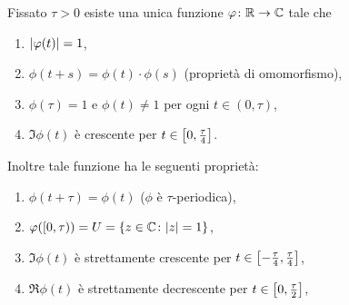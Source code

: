 \begin{theorem}
Fissato $\tau>0$ esiste una unica funzione $\varphi\colon {\mathbb R} \to {\mathbb C}$ tale che 
\begin{enumerate}
\item ${\left|\varphi(t)\right|}=1$,
\item $\phi(t+s)=\phi(t)\cdot \phi(s)$ (proprietà di omomorfismo),
\item $\phi(\tau) = 1$ e $\phi(t)\neq 1$ per ogni $t\in(0,\tau)$,
\item $\Im\phi(t)$ è crescente per $t\in{\left[ 0,\frac \tau 4 \right]}$.
\end{enumerate}

Inoltre tale funzione ha le seguenti proprietà:
\begin{enumerate}
  \item $\phi(t+\tau)=\phi(t)$ ($\phi$ è $\tau$-periodica),
  \item $\varphi([0,\tau)) = U = {\left\{ z\in {\mathbb C}\colon {\left|z\right|}=1 \right\}}$,
  \item $\Im \phi(t)$ è strettamente crescente per $t\in{\left[ -\frac \tau 4,\frac \tau 4 \right]}$,
  \item $\Re \phi(t)$ è strettamente decrescente per $t\in{\left[ 0,\frac \tau 2 \right]}$,
\end{enumerate}
\end{theorem}
%
